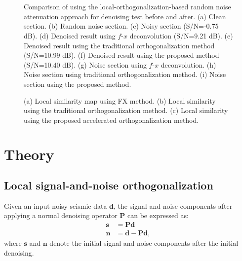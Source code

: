 \begin{figure}[htb!]
\centering
{}
\\
   \\  
\caption{Comparison of using the local-orthogonalization-based random noise attenuation approach for denoising test before and after. (a) Clean section. (b) Random noise section. (c) Noisy section (S/N=-0.75 dB). (d) Denoised result using $f$-$x$ deconvolution (S/N=9.21 dB). (e) Denoised result using the traditional orthogonalization method (S/N=10.99 dB). (f) Denoised result using the proposed method (S/N=10.40 dB). (g) Noise section using $f$-$x$ deconvolution. (h) Noise section using traditional orthogonalization method. (i) Noise section using the proposed method.}
\label{fig:c,n,cn,cfx,cfx2,cfx22,cdifffx,cdifffx2,cdifffx22}
\end{figure}

\begin{figure}[htb!]
\centering
{}
\caption{(a) Local similarity map using FX method. (b) Local similarity using the traditional orthogonalization method. (c) Local similarity using the proposed accelerated orthogonalization method.}
\label{fig:csimi-difffx,csimi-difffx2,csimi-difffx22}
\end{figure}


\section{Theory}
\subsection{Local signal-and-noise orthogonalization}
Given an input noisy seismic data $\mathbf{d}$, the signal and noise components after applying a normal denoising operator $\mathbf{P}$ can be expressed as:
\begin{align}
\label{eq:sn}
\mathbf{s} &= \mathbf{Pd}\\
\label{eq:snn}
\mathbf{n} &= \mathbf{d} -  \mathbf{Pd},
\end{align}
where $\mathbf{s}$ and $\mathbf{n}$ denote the initial signal and noise components after the initial denoising. 

